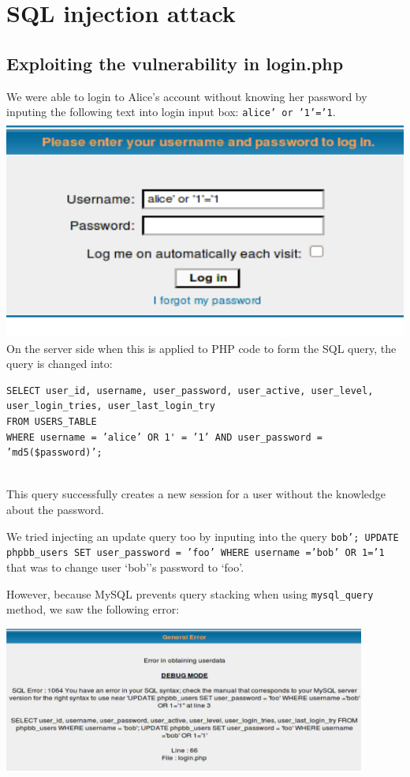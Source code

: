 \documentclass[12pt, a4paper, pdflatex]{article}
\begin{document}
\section{SQL injection attack}

\subsection{Exploiting the vulnerability in login.php}

We were able to login to Alice's account without knowing her password by inputing the following
text into login input box: \texttt{alice' or '1'='1}.\\
\includegraphics{gfx/sql/login.png}\\ On the server side when this is applied
to PHP code to form the SQL query, the query is changed into:

\lstset{
  captionpos=b,
  frame=single,
  language=PHP,
  breaklines=true,
  label=sql1
}
\begin{lstlisting}
SELECT user_id, username, user_password, user_active, user_level,
user_login_tries, user_last_login_try
FROM USERS_TABLE
WHERE username = ’alice’ OR 1' = ’1’ AND user_password = ’md5($password)’;
\end{lstlisting}\\
This query successfully creates a new session for a user without the knowledge about the password.

We tried injecting an update query too by inputing into the query
\texttt{bob'; UPDATE phpbb\_users SET user\_password = 'foo' WHERE username ='bob' OR 1='1} 
that was to change user `bob''s password to `foo'.  

However, because MySQL prevents query stacking when using \texttt{mysql\_query} method, we saw the following error:

\includegraphics[width=450px]{gfx/sql/updateerr.png}
\end{document}
